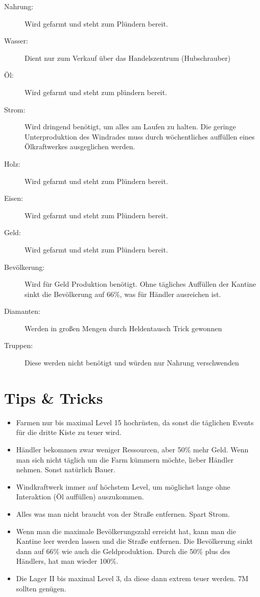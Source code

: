 \documentclass[fontsize=12pt,a4paper]{scrartcl}[2003/01/01]
\begin{document}
\begin{description}
  \item[Nahrung:] Wird gefarmt und steht zum Plündern bereit.
  \item[Wasser:] Dient nur zum Verkauf über das Handelszentrum (Hubschrauber)
  \item[Öl:] Wird gefarmt und steht zum plündern bereit.
  \item[Strom:] Wird dringend benötigt, um alles am Laufen zu halten. Die geringe Unterproduktion des Windrades muss durch wöchentliches auffüllen eines Ölkraftwerkes ausgeglichen werden.
  \item[Holz:] Wird gefarmt und steht zum Plündern bereit.
  \item[Eisen:] Wird gefarmt und steht zum Plündern bereit.
  \item[Geld:] Wird gefarmt und steht zum Plündern bereit.
  \item[Bevölkerung:] Wird für Geld Produktion benötigt. Ohne tägliches Auffüllen der Kantine sinkt die Bevölkerung auf 66\%, was für Händler ausreichen ist.
  \item[Diamanten:] Werden in großen Mengen durch Heldentausch Trick gewonnen
  \item[Truppen:] Diese werden nicht benötigt und würden nur Nahrung verschwenden
\end{description}



\section{Tips \& Tricks}

\begin{itemize}
  \item Farmen nur bis maximal Level 15 hochrüsten, da sonst die täglichen Events für die dritte Kiste zu teuer wird.
  \item Händler bekommen zwar weniger Ressourcen, aber 50\% mehr Geld. Wenn man sich nicht täglich um die Farm kümmern möchte, lieber Händler nehmen. Sonst natürlich Bauer.
  \item Windkraftwerk immer auf höchstem Level, um möglichst lange ohne Interaktion (Öl auffüllen) auszukommen.
  \item Alles was man nicht braucht von der Straße entfernen. Spart Strom.
  \item Wenn man die maximale Bevölkerungszahl erreicht hat, kann man die Kantine leer werden lassen und die Straße entfernen. Die Bevölkerung sinkt dann auf 66\% wie auch die Geldproduktion. Durch die 50\% plus des Händlers, hat man wieder 100\%.
  \item Die Lager II bis maximal Level 3, da diese dann extrem teuer werden. 7M sollten genügen.
\end{itemize}	
\end{document}

